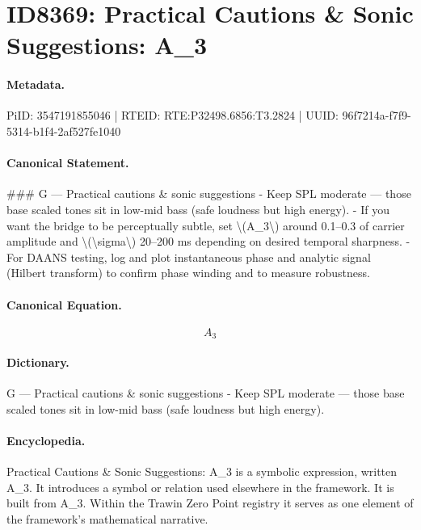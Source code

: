 \section*{ID8369: Practical Cautions \& Sonic Suggestions: A\_3}
\paragraph{Metadata.}
PiID: 3547191855046 | RTEID: RTE:P32498.6856:T3.2824 | UUID: 96f7214a-f7f9-5314-b1f4-2af527fe1040

\paragraph{Canonical Statement.}
\#\#\# G — Practical cautions \& sonic suggestions - Keep SPL moderate — those base scaled tones sit in low-mid bass (safe loudness but high energy). - If you want the bridge to be perceptually subtle, set \textbackslash{}(A\_3\textbackslash{}) around 0.1–0.3 of carrier amplitude and \textbackslash{}(\textbackslash{}sigma\textbackslash{}) 20–200 ms depending on desired temporal sharpness. - For DAANS testing, log and plot instantaneous phase and analytic signal (Hilbert transform) to confirm phase winding and to measure robustness.

\paragraph{Canonical Equation.}
\[
A_3
\]

\paragraph{Dictionary.}
G — Practical cautions \& sonic suggestions - Keep SPL moderate — those base scaled tones sit in low-mid bass (safe loudness but high energy).

\paragraph{Encyclopedia.}
Practical Cautions \& Sonic Suggestions: A\_3 is a symbolic expression, written A\_3. It introduces a symbol or relation used elsewhere in the framework. It is built from A\_3. Within the Trawin Zero Point registry it serves as one element of the framework's mathematical narrative.

